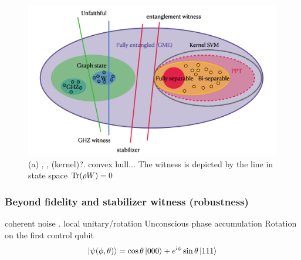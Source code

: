 \documentclass[
reprint,
aps,
pra,
floatfix,
]{revtex4-2}
\theoremstyle{plain}
\newtheorem{theorem}{Theorem}
\theoremstyle{definition}
\newcommand{\ew}{W}
\newcommand{\dm}{\rho}
\begin{document}
\begin{figure}[!ht]
	\centering
		\centering
		\includegraphics[width=.7\linewidth]{witness.png}
	\caption{(a) , ,  (kernel)?. convex hull... The witness is depicted by the line in state space $\Tr(\dm\ew)=0$}
	\label{fig:entangle}
\end{figure}

\subsubsection{Beyond fidelity and stabilizer witness (robustness)}
coherent noise \cite{zhouEntanglementDetectionCoherent2020}.
local unitary/rotation
Unconscious phase accumulation 
Rotation on the first control qubit 
\begin{equation}
	\ket{\psi(\phi,\theta)}=
	\cos\theta\ket{000}+e^{\textup{i} \phi}\sin\theta\ket{111}
	\label{eq:coherent_noise}
\end{equation}
\end{document}
